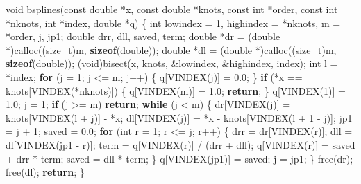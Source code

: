 \documentclass[
  12pt,
]{book}
\newenvironment{Shaded}{\begin{snugshade}}{\end{snugshade}}
\newcommand{\ControlFlowTok}[1]{\textcolor[rgb]{0.13,0.29,0.53}{\textbf{#1}}}
\newcommand{\DataTypeTok}[1]{\textcolor[rgb]{0.13,0.29,0.53}{#1}}
\newcommand{\DecValTok}[1]{\textcolor[rgb]{0.00,0.00,0.81}{#1}}
\newcommand{\FloatTok}[1]{\textcolor[rgb]{0.00,0.00,0.81}{#1}}
\newcommand{\KeywordTok}[1]{\textcolor[rgb]{0.13,0.29,0.53}{\textbf{#1}}}
\newcommand{\NormalTok}[1]{#1}
\theoremstyle{definition}
\theoremstyle{definition}
\theoremstyle{definition}
\theoremstyle{definition}
\theoremstyle{remark}
\begin{document}
\begin{Shaded}
\begin{Highlighting}[]
\DataTypeTok{void}\NormalTok{ bsplines(}\DataTypeTok{const} \DataTypeTok{double}\NormalTok{ *x, }\DataTypeTok{const} \DataTypeTok{double}\NormalTok{ *knots, }\DataTypeTok{const} \DataTypeTok{int}\NormalTok{ *order,}
              \DataTypeTok{const} \DataTypeTok{int}\NormalTok{ *nknots, }\DataTypeTok{int}\NormalTok{ *index, }\DataTypeTok{double}\NormalTok{ *q) \{}
    \DataTypeTok{int}\NormalTok{ lowindex = }\DecValTok{1}\NormalTok{, highindex = *nknots, m = *order, j, jp1;}
    \DataTypeTok{double}\NormalTok{ drr, dll, saved, term;}
    \DataTypeTok{double}\NormalTok{ *dr = (}\DataTypeTok{double}\NormalTok{ *)calloc((}\DataTypeTok{size\_t}\NormalTok{)m, }\KeywordTok{sizeof}\NormalTok{(}\DataTypeTok{double}\NormalTok{));}
    \DataTypeTok{double}\NormalTok{ *dl = (}\DataTypeTok{double}\NormalTok{ *)calloc((}\DataTypeTok{size\_t}\NormalTok{)m, }\KeywordTok{sizeof}\NormalTok{(}\DataTypeTok{double}\NormalTok{));}
\NormalTok{    (}\DataTypeTok{void}\NormalTok{)bisect(x, knots, \&lowindex, \&highindex, index);}
    \DataTypeTok{int}\NormalTok{ l = *index;}
    \ControlFlowTok{for}\NormalTok{ (j = }\DecValTok{1}\NormalTok{; j \textless{}= m; j++) \{}
\NormalTok{        q[VINDEX(j)] = }\FloatTok{0.0}\NormalTok{;}
\NormalTok{    \}}
    \ControlFlowTok{if}\NormalTok{ (*x == knots[VINDEX(*nknots)]) \{}
\NormalTok{        q[VINDEX(m)] = }\FloatTok{1.0}\NormalTok{;}
        \ControlFlowTok{return}\NormalTok{;}
\NormalTok{    \}}
\NormalTok{    q[VINDEX(}\DecValTok{1}\NormalTok{)] = }\FloatTok{1.0}\NormalTok{;}
\NormalTok{    j = }\DecValTok{1}\NormalTok{;}
    \ControlFlowTok{if}\NormalTok{ (j \textgreater{}= m) }\ControlFlowTok{return}\NormalTok{;}
    \ControlFlowTok{while}\NormalTok{ (j \textless{} m) \{}
\NormalTok{        dr[VINDEX(j)] = knots[VINDEX(l + j)] {-} *x;}
\NormalTok{        dl[VINDEX(j)] = *x {-} knots[VINDEX(l + }\DecValTok{1}\NormalTok{ {-} j)];}
\NormalTok{        jp1 = j + }\DecValTok{1}\NormalTok{;}
\NormalTok{        saved = }\FloatTok{0.0}\NormalTok{;}
        \ControlFlowTok{for}\NormalTok{ (}\DataTypeTok{int}\NormalTok{ r = }\DecValTok{1}\NormalTok{; r \textless{}= j; r++) \{}
\NormalTok{            drr = dr[VINDEX(r)];}
\NormalTok{            dll = dl[VINDEX(jp1 {-} r)];}
\NormalTok{            term = q[VINDEX(r)] / (drr + dll);}
\NormalTok{            q[VINDEX(r)] = saved + drr * term;}
\NormalTok{            saved = dll * term;}
\NormalTok{        \}}
\NormalTok{        q[VINDEX(jp1)] = saved;}
\NormalTok{        j = jp1;}
\NormalTok{    \}}
\NormalTok{    free(dr);}
\NormalTok{    free(dl);}
    \ControlFlowTok{return}\NormalTok{;}
\NormalTok{\}}


\end{Highlighting}
\end{Shaded}
\end{document}
